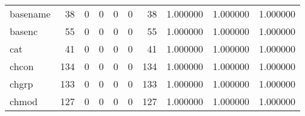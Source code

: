 \begin{tabular}{lrrrrrrrrr}
basename  &                                        38 &                                                  0 &                                                  0 &                                                  0 &                                                  0 &                                                 38 &                                           1.000000 &                               1.000000 &                             1.000000 \\
basenc    &                                        55 &                                                  0 &                                                  0 &                                                  0 &                                                  0 &                                                 55 &                                           1.000000 &                               1.000000 &                             1.000000 \\
cat       &                                        41 &                                                  0 &                                                  0 &                                                  0 &                                                  0 &                                                 41 &                                           1.000000 &                               1.000000 &                             1.000000 \\
chcon     &                                       134 &                                                  0 &                                                  0 &                                                  0 &                                                  0 &                                                134 &                                           1.000000 &                               1.000000 &                             1.000000 \\
chgrp     &                                       133 &                                                  0 &                                                  0 &                                                  0 &                                                  0 &                                                133 &                                           1.000000 &                               1.000000 &                             1.000000 \\
chmod     &                                       127 &                                                  0 &                                                  0 &                                                  0 &                                                  0 &                                                127 &                                           1.000000 &                               1.000000 &                             1.000000 \\

\end{tabular}
